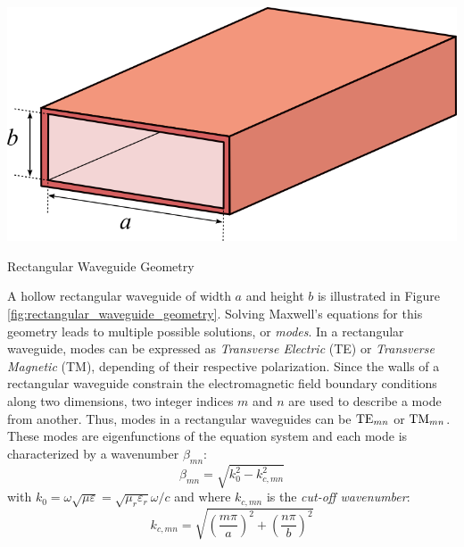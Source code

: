 \begin{marginfigure}[0cm]
	\includegraphics[width=1\linewidth]{figures/chap3/rectangular_waveguide}
	\caption{Rectangular Waveguide Geometry}
	\label{fig:rectangular_waveguide_geometry}
\end{marginfigure}

A hollow rectangular waveguide of width $a$ and height $b$ is illustrated in Figure \ref{fig:rectangular_waveguide_geometry}. Solving Maxwell’s equations for this geometry leads to multiple possible solutions, or \emph{modes}. In a rectangular waveguide, modes can be expressed as \emph{Transverse Electric} (TE) or \emph{Transverse Magnetic} (TM), depending of their respective polarization. Since the walls of a rectangular waveguide constrain the electromagnetic field boundary conditions along two dimensions, two integer indices $m$ and $n$ are used to describe a mode from another. Thus, modes in a rectangular waveguides can be ${\mathrm{TE}}_{mn}$ or ${\mathrm{TM}}_{mn}$. These modes are eigenfunctions of the equation system and each mode is characterized by a wavenumber $\beta_{mn}$:
\begin{equation}
	\beta_{mn} = \sqrt{k^2_0 - k_{c,mn}^2 }
	\label{eq:rectwg_wavenumber}
\end{equation}
with $k_0=\omega\sqrt{\mu\varepsilon}=\sqrt{\mu_r \varepsilon_{r}}\omega/c$ and where $k_{c,mn}$ is the \textit{cut-off wavenumber}:
\begin{equation}
	k_{c,mn}
	=
	\sqrt{\left(\frac{m\pi}{a}\right)^{2}+\left(\frac{n\pi}{b}\right)^{2}}
	\label{eq:rectwg_cutoff_wavenumber}
\end{equation}


